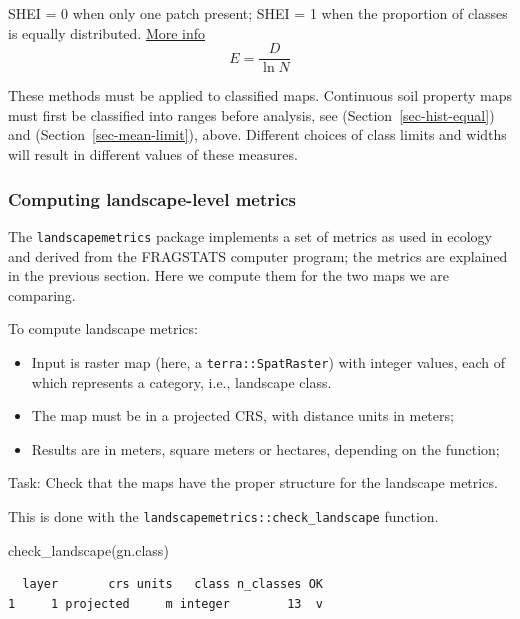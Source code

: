 \documentclass[
  letterpaper,
  DIV=11,
  numbers=noendperiod]{scrartcl}
\newenvironment{Shaded}{\begin{snugshade}}{\end{snugshade}}
\newcommand{\FunctionTok}[1]{\textcolor[rgb]{0.28,0.35,0.67}{#1}}
\newcommand{\NormalTok}[1]{\textcolor[rgb]{0.00,0.23,0.31}{#1}}
\providecommand{\tightlist}{%
  \setlength{\itemsep}{0pt}\setlength{\parskip}{0pt}}\usepackage{longtable,booktabs,array}
\begin{document}
SHEI = 0 when only one patch present; SHEI = 1 when the proportion of
classes is equally distributed.
\href{https://r-spatialecology.github.io/landscapemetrics/reference/lsm_l_shei.html?q=shei}{More
info} \[E = \frac{D}{\ln N}\]

These methods must be applied to classified maps. Continuous soil
property maps must first be classified into ranges before analysis, see
(Section~\ref{sec-hist-equal}) and (Section~\ref{sec-mean-limit}),
above. Different choices of class limits and widths will result in
different values of these measures.

\hypertarget{compute-sec-lsm}{%
\subsubsection{Computing landscape-level
metrics}\label{compute-sec-lsm}}

The \texttt{landscapemetrics} package implements a set of metrics as
used in ecology and derived from the FRAGSTATS computer program; the
metrics are explained in the previous section. Here we compute them for
the two maps we are comparing.

To compute landscape metrics:

\begin{itemize}
\tightlist
\item
  Input is raster map (here, a \texttt{terra::SpatRaster}) with integer
  values, each of which represents a category, i.e., landscape class.
\item
  The map must be in a projected CRS, with distance units in meters;
\item
  Results are in meters, square meters or hectares, depending on the
  function;
\end{itemize}

Task: Check that the maps have the proper structure for the landscape
metrics.

This is done with the \texttt{landscapemetrics::check\_landscape}
function.

\begin{Shaded}
\begin{Highlighting}[]
\FunctionTok{check\_landscape}\NormalTok{(gn.class)}
\end{Highlighting}
\end{Shaded}

\begin{verbatim}
  layer       crs units   class n_classes OK
1     1 projected     m integer        13  v
\end{verbatim}
\end{document}

